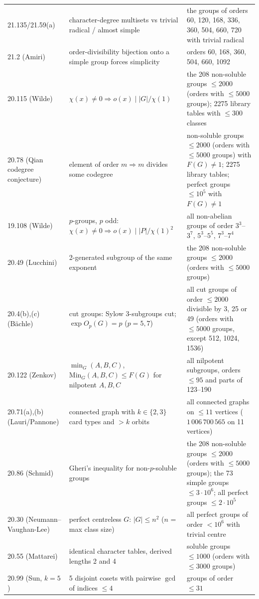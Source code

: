 \begin{longtable}{L{2.6cm}L{5.3cm}L{6.8cm}}
21.135/21.59(a) & character-degree multisets vs trivial radical / almost simple & the groups of orders 60, 120, 168, 336, 360, 504, 660, 720 with trivial radical \\
21.2 (Amiri) & order-divisibility bijection onto a simple group forces simplicity & orders 60, 168, 360, 504, 660, 1092 \\
20.115 (Wilde) & $\chi(x)\ne0\Rightarrow o(x)\mid |G|/\chi(1)$ & the 208 non-soluble groups $\le 2000$ (orders with $\le 5000$ groups); 2275 library tables with $\le 300$ classes \\
20.78 (Qian codegree conjecture) & element of order $m\Rightarrow m$ divides some codegree & non-soluble groups $\le 2000$ (orders with $\le 5000$ groups) with $F(G)\ne1$; 2275 library tables; perfect groups $\le 10^5$ with $F(G)\ne 1$ \\
19.108 (Wilde) & $p$-groups, $p$ odd: $\chi(x)\ne0\Rightarrow o(x)\mid|P|/\chi(1)^2$ & all non-abelian groups of order $3^3$--$3^7$, $5^3$--$5^5$, $7^3$--$7^4$ \\
20.49 (Lucchini) & 2-generated subgroup of the same exponent & the 208 non-soluble groups $\le 2000$ (orders with $\le 5000$ groups) \\
20.4(b),(c) (Bächle) & cut groups: Sylow 3-subgroups cut; $\exp O_p(G)=p$ ($p=5,7$) & all cut groups of order $\le 2000$ divisible by 3, 25 or 49 (orders with $\le 5000$ groups, except 512, 1024, 1536) \\
20.122 (Zenkov) & $\min_G(A,B,C)$, $\mathrm{Min}_G(A,B,C)\le F(G)$ for nilpotent $A,B,C$ & all nilpotent subgroups, orders $\le 95$ and parts of 123--190 \\
20.71(a),(b) (Lauri/Pannone) & connected graph with $k\in\{2,3\}$ card types and $>k$ orbits & all connected graphs on $\le 11$ vertices ($1\,006\,700\,565$ on 11 vertices) \\
20.86 (Schmid) & Gheri's inequality for non-$p$-soluble groups & the 208 non-soluble groups $\le 2000$ (orders with $\le 5000$ groups); the 73 simple groups $\le 3\cdot10^6$; all perfect groups $\le 2\cdot10^5$ \\
20.30 (Neumann--Vaughan-Lee) & perfect centreless $G$: $|G|\le n^2$ ($n$ = max class size) & all perfect groups of order $<10^6$ with trivial centre \\
20.55 (Mattarei) & identical character tables, derived lengths 2 and 4 & soluble groups $\le 1000$ (orders with $\le 3000$ groups) \\
20.99 (Sun, $k=5$) & 5 disjoint cosets with pairwise $\gcd$ of indices $\le 4$ & groups of order $\le 31$ \\

\end{longtable}
